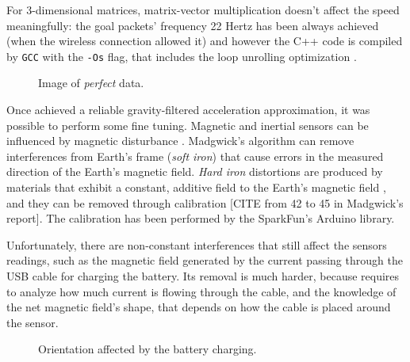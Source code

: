 For 3-dimensional matrices, matrix-vector multiplication doesn't affect the speed meaningfully: the goal packets' frequency 22 Hertz has been always achieved (when the wireless connection allowed it) and however the C++ code is compiled by \texttt{GCC} with the \texttt{-Os} flag, that includes the loop unrolling optimization \cite{UsingGCC}.

\begin{center}
	\begin{figure}[ht!]
		\caption{Image of \textit{perfect} data.}
	\end{figure}
\end{center}

Once achieved a reliable gravity-filtered acceleration approximation, it was possible to perform some fine tuning. Magnetic and inertial sensors can be influenced by magnetic disturbance \cite{Fan17}. Madgwick's algorithm can remove interferences from Earth's frame (\textit{soft iron}) \cite[11-12]{Mad10} that cause errors in the measured direction of the Earth's magnetic field. \textit{Hard iron} distortions are produced by materials that exhibit a constant, additive field to the Earth's magnetic field \cite{CompensatingIron}, and they can be removed through calibration \cite{CompensatingIron, Geb06, Kok12} [CITE from 42 to 45 in Madgwick's report]. The calibration has been performed by the SparkFun's Arduino library.
\bigbreak

Unfortunately, there are non-constant interferences that still affect the sensors readings, such as the magnetic field generated by the current passing through the USB cable for charging the battery.
Its removal is much harder, because requires to analyze how much current is flowing through the cable, and the knowledge of the net magnetic field's shape, that depends on how the cable is placed around the sensor.

\begin{center}
	\begin{figure}[ht!]
		\caption{Orientation affected by the battery charging.}
	\end{figure}
\end{center}

